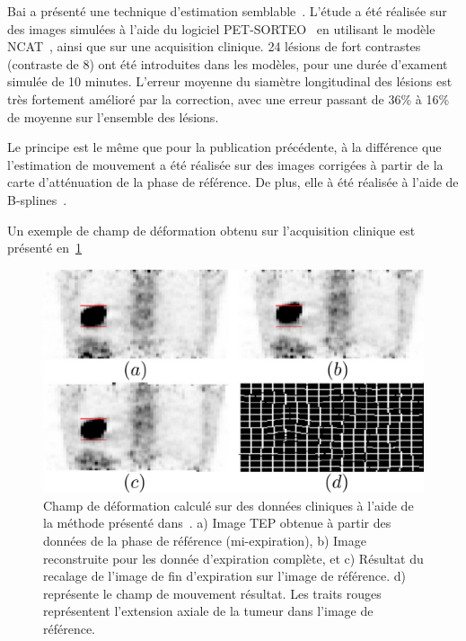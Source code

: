 Bai a présenté une technique d'estimation semblable~\cite{bai2009regularized}. L'étude a été réalisée sur des images simulées à l'aide du logiciel PET-SORTEO~\cite{reilhac2005pet} en utilisant le modèle NCAT~\cite{segars2009mcatoverview}, ainsi que sur une acquisition clinique. 24 lésions de fort contrastes (contraste de 8) ont été introduites dans les modèles, pour une durée d'exament simulée de 10 minutes. L'erreur moyenne du siamètre longitudinal des lésions est très fortement amélioré par la correction, avec une erreur passant de 36\% à 16\% de moyenne sur l'ensemble des lésions.

Le principe est le même que pour la publication précédente, à la différence que l'estimation de mouvement a été réalisée sur des images corrigées à partir de la carte d'atténuation de la phase de référence. De plus, elle à été réalisée à l'aide de B-splines~\cite{thevenaz2000optimization}.

Un exemple de champ de déformation obtenu sur l'acquisition clinique est présenté en~\ref{fig:champMouvementBai}

\begin{figure}[h!]
	\begin{center}
		\includegraphics[width=12cm]{images/champDeformBai2}
	\end{center}
	\caption[Exemple de champ de mouvement]{Champ de déformation calculé sur des données cliniques à l'aide de la méthode présenté dans~\cite{bai2009regularized}. a) Image TEP obtenue à partir des données de la phase de référence  (mi-expiration), b) Image reconstruite pour les donnée d'expiration complète, et c) Résultat du recalage de l'image de fin d'expiration sur l'image de référence. d) représente le champ de mouvement résultat. Les traits rouges représentent l'extension axiale de la tumeur dans l'image de référence.} 
	\label{fig:champMouvementBai}
\end{figure}


